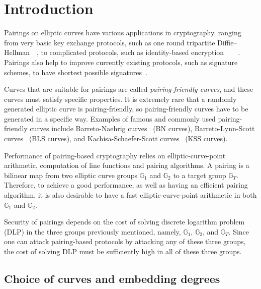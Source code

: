 \section{Introduction}
\label{sec:intro}

Pairings on elliptic curves have various applications in cryptography,
ranging from very basic key exchange protocols,
such as one round tripartite Diffie--Hellman~\cite{2000/joux-ants}~\cite{2004/joux-tripartite},
to complicated protocols, such as
identity-based encryption~\cite{2001/boneh}~\cite{2002/horwitz}~\cite{2002/gentry}~\cite{2005/sahai}.
Pairings also help to improve currently existing protocols, 
such as signature schemes, to have shortest possible signatures~\cite{2004/boneh}.

Curves that are suitable for pairings are called {\emph{pairing-friendly curves}},
and these curves must satisfy specific properties.
It is extremely rare that a randomly generated elliptic curve is pairing-friendly,
so pairing-friendly curves have to be generated in a specific way.
Examples of famous and commonly used pairing-friendly curves include 
Barreto-Naehrig curves~\cite{2006/barreto} (BN curves),
Barreto-Lynn-Scott curves~\cite{2003/bls} (BLS curves), and
Kachisa-Schaefer-Scott curves~\cite{2008/kss} (KSS curves).

Performance of pairing-based cryptography relies on
elliptic-curve-point arithmetic, computation of line functions and pairing algorithms.
A pairing is a bilinear map from two elliptic curve groups $\mathbb{G}_1$ and $\mathbb{G}_2$ to
a target group $\mathbb{G}_T$.
Therefore, to achieve a good performance, as well as having an efficient pairing algorithm,
it is also desirable to have a fast elliptic-curve-point arithmetic in both $\mathbb{G}_1$ and $\mathbb{G}_2$.

Security of pairings depends on the cost of solving discrete logarithm problem (DLP) in the three groups previously mentioned,
namely, $\mathbb{G}_1$, $\mathbb{G}_2$, and $\mathbb{G}_T$.
Since one can attack pairing-based protocols by attacking any of these three groups,
the cost of solving DLP must be sufficiently high in all of these three groups.


\subsection{Choice of curves and embedding degrees}

